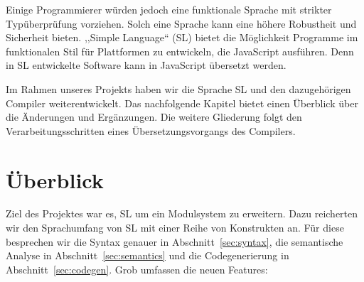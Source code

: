 \documentclass[runningheads]{llncs}
\begin{document}
Einige Programmierer würden jedoch eine funktionale Sprache mit strikter Typüberprüfung vorziehen. Solch eine Sprache kann eine höhere Robustheit und Sicherheit bieten. ,,Simple Language`` (SL) bietet die Möglichkeit Programme im funktionalen Stil für Plattformen zu entwickeln, die JavaScript ausführen. Denn in SL entwickelte Software kann in JavaScript übersetzt werden.

Im Rahmen unseres Projekts haben wir die Sprache SL und den dazugehörigen Compiler weiterentwickelt. Das nachfolgende Kapitel bietet einen Überblick über die Änderungen und Ergänzungen. Die weitere Gliederung folgt den Verarbeitungsschritten eines Übersetzungsvorgangs des Compilers.

\section{Überblick}

Ziel des Projektes war es, SL um ein Modulsystem zu erweitern. Dazu
reicherten wir den Sprachumfang von SL mit einer Reihe von Konstrukten an. Für
diese besprechen wir die Syntax genauer in Abschnitt~\ref{sec:syntax},
die semantische Analyse in Abschnitt~\ref{sec:semantics} und die
Codegenerierung in Abschnitt~\ref{sec:codegen}. Grob umfassen die neuen
Features:
\end{document}
